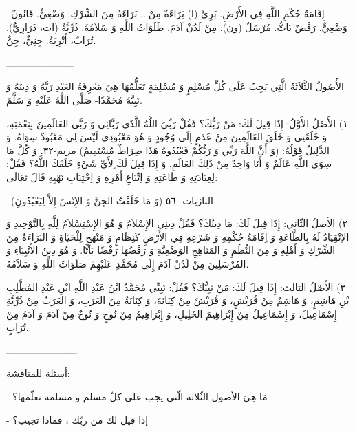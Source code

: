 \documentclass[a5paper]{article}
\begin{document}
\ إِقَامَةُ حُكْمِ اللَّهِ فِي الأَرْضِ. بَرِئَ (ا) بَرَاءَةٌ مِنْ... بَرَاءَةٌ مِنَ الشِّرْكِ. وَضْعِيٌّ. قَانُونٌ وَضْعِيٌّ. رَفْضٌ بَاتٌّ. مُرْسَلٌ (ون). مِنْ لَدُنْ آدَمَ. طَلَوَاتُ اللَّهِ وَ سَلاَمُهُ. ذُرِّيَّةٌ (ات، ذَرَارِيُّ). تُرَابٌ، أَتْرِبَةٌ. جِنِيٌّ، جِنٌّ.

ــــــــــــــــــــــــ

الأُصُولُ الثَّلاَثَةُ الَّتِي يَجِبُ عَلَى كُلِّ مُسْلِمٍ وَ مُسْلِمَةٍ تَعَلُّمُهَا هِيَ مَعْرِفَةُ العَبْدِ رَبَّهُ وَ دِينَهُ وَ نَبِيَّهُ مُحَمَّدًا- صَلَّى اللَّهُ عَلَيْهِ وَ سَلَّمَ. 

١) الأَصْلُ الأَوَّلُ: إِذَا قِيلَ لَكَ: مَنْ رَبُّكَ؟ فَقُلْ رَبِّيَ اللَّهُ الَّذَي رَبَّانِي وَ رَبَّى العَالَمِينَ بِنِعْمَتِهِ، وَ خَلَقَنِي وَ خَلَقَ العَالَمِينَ مِنْ عَدَمٍ إِلَى وُجُودٍ وَ هُوَ مَعْبُودِي لَيْسَ لِي مَعْبُودٌ سِوَاهُ. وَ الدَّلِيلُ قَوْلُهُ: (وَ أَنَّ اللَّهَ رَبِّي وَ رَبُّكُمْ فَعْبُدُوهُ هَذَا صِرَاطٌ مُسْتَقِيمٌ) مريم-٣٢. وَ كُلَّ مَا سِوَى اللَّهِ عَالَمٌ وَ أَنَا وَاحِدٌ مِنْ ذَلِكَ العَالَمِ. وَ إِذَا قِيلَ لَكَ ِلأَيِّ شَيْءٍ خَلَقَكَ اللَّهُ؟ فَقُلْ: لِعِبَادَتِهِ وَ طَاعَتِهِ وَ اِتِّبَاعِ أَمْرِهِ وَ اِجْتِنَابِ نَهْيِهِ قَالَ تَعَالَى:

\ (وَ مَا خَلَقْتُ الجِنَّ وَ الإِنْسَ إِلاَّ لِيَعْبُدُونِ) النازيات- ٥٦ 

٢) الأصلُ الثّاني: إِذَا قِيلَ لَكَ: مَا دِينُكَ؟ فَقُلْ دِينِي الإِسْلاَمُ وَ هُوَ الإِسْتِسْلاَمُ لِلَّهِ بِالتَّوْحِيدِ وَ الاِنْقِيَادُ لَهُ بِالطَّاعَةِ وَ اِقَامَةُ حُكْمِهِ وَ شَرْعِهِ فِي الأَرْضِ كَنِظَامٍ وَ مَنْهَجٍ لِلْحَيَاةِ وَ البَرَاءَةُ مِنَ الشِّرْكِ وَ أَهْلِهِ وَ مِنَ النُّظُمِ وَ المَنَاهِجِ الوَضْعِيَّةِ وَ رَفْضُهَا رَفْضًا بَاتًّا. وَ هُوَ دِينُ الأَنْبِيَاءِ وَ المُرْسَلِينَ مِنْ لَدُنْ آدَمَ إِلَى مُحَمَّدٍ عَلَيْهِمْ صَلَوَاتُ اللَّهِ وَ سَلاَمُهُ. 

٣) الأَصْلُ الثالث: إِذَا قِيلَ لَكَ: مَنْ نَبِيُّكَ؟ فَقُلْ: نَبِيِّي مُحَمَّدُ ابْنُ عَبْدِ اللَّهِ ابْنِ عَبْدِ المُطَّلِبِ بْنِ هَاشِمٍ، وَ هَاشِمٌ مِنْ قُرَيْشٍ، وَ قُرَيْشٌ مِنْ كِنَانَةَ، وَ كِنَانَةُ مِنَ العَرَبِ، وَ العَرَبُ مِنْ ذُرِّيَّةِ إِسْمَاعِيلَ، وَ إِسْمَاعِيلُ مِنْ إِبْرَاهِيمَ الخَلِيلِ، وَ إِبْرَاهِيمُ مِنْ نُوحٍ وَ نُوحٌ مِنْ آدَمَ وَ آدَمُ مِنْ تُرَابٍ.

ـــــــــــــــــــــــــ

أسئلة للمناقشة:

- مَا هِيَ الأصول الثّلاثة الّتي يجب على كلّ مسلم و مسلمة تعلّمها؟

- إذا قيل لك من ربّك ، فماذا تجيب؟
\end{document}
